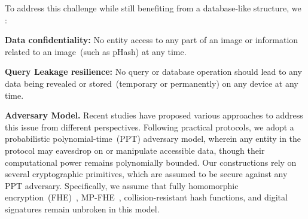 To address this challenge while still benefiting from a database-like structure, we :

\begin{compactitem}[-]
    \item \textbf{Data confidentiality:} No entity  access to any part of an image or information related to an image~(such as pHash) at any time.
    
    \item \textbf{Query Leakage resilience:} No query or database operation should lead to any data being revealed or stored~(temporary or permanently) on any device at any time.


\end{compactitem}





\noindent\textbf{Adversary Model.}
Recent studies have proposed various approaches to address this issue from different perspectives. Following practical protocols, we adopt a probabilistic polynomial-time~(PPT) adversary model, wherein any entity in the protocol may eavesdrop on or manipulate accessible data, though their computational power remains polynomially bounded.
Our constructions rely on several cryptographic primitives, which are assumed to be secure against any PPT adversary. Specifically, we assume that fully homomorphic encryption~(FHE)~\cite{albrecht2021homomorphic, lee2023efficient, damgard2008homomorphic}, MP-FHE~\cite{mouchet2021multiparty}, collision-resistant hash functions, and digital signatures remain unbroken in this model.

